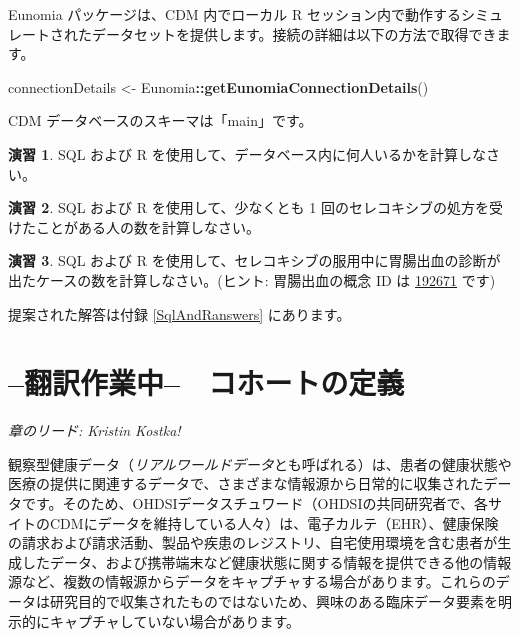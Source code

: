 \documentclass[
  11pt]{book}
\newenvironment{Shaded}{\begin{snugshade}}{\end{snugshade}}
\newcommand{\FunctionTok}[1]{\textcolor[rgb]{0.13,0.29,0.53}{\textbf{#1}}}
\newcommand{\NormalTok}[1]{#1}
\newcommand{\OtherTok}[1]{\textcolor[rgb]{0.56,0.35,0.01}{#1}}
\newcommand{\SpecialCharTok}[1]{\textcolor[rgb]{0.81,0.36,0.00}{\textbf{#1}}}
\theoremstyle{definition}
\theoremstyle{definition}
\theoremstyle{definition}
\newtheorem{exercise}{演習}[chapter]
\theoremstyle{definition}
\theoremstyle{remark}
\begin{document}
Eunomia パッケージは、CDM 内でローカル R セッション内で動作するシミュレートされたデータセットを提供します。接続の詳細は以下の方法で取得できます。

\begin{Shaded}
\begin{Highlighting}[]
\NormalTok{connectionDetails }\OtherTok{\textless{}{-}}\NormalTok{ Eunomia}\SpecialCharTok{::}\FunctionTok{getEunomiaConnectionDetails}\NormalTok{()}
\end{Highlighting}
\end{Shaded}

CDM データベースのスキーマは「main」です。

\begin{exercise}
\protect\hypertarget{exr:exercisePeopleCount}{}\label{exr:exercisePeopleCount}SQL および R を使用して、データベース内に何人いるかを計算しなさい。
\end{exercise}

\begin{exercise}
\protect\hypertarget{exr:exerciseCelecoxibUsers}{}\label{exr:exerciseCelecoxibUsers}SQL および R を使用して、少なくとも 1 回のセレコキシブの処方を受けたことがある人の数を計算しなさい。
\end{exercise}

\begin{exercise}
\protect\hypertarget{exr:exerciseGiBleedsDuringCelecoxib}{}\label{exr:exerciseGiBleedsDuringCelecoxib}SQL および R を使用して、セレコキシブの服用中に胃腸出血の診断が出たケースの数を計算しなさい。(ヒント: 胃腸出血の概念 ID は \href{http://athena.ohdsi.org/search-terms/terms/192671}{192671} です)
\end{exercise}

提案された解答は付録 \ref{SqlAndRanswers} にあります。

\chapter{--翻訳作業中--　コホートの定義}\label{Cohorts}

\emph{章のリード: Kristin Kostka!}

観察型健康データ（\emph{リアルワールドデータ}とも呼ばれる）は、患者の健康状態や医療の提供に関連するデータで、さまざまな情報源から日常的に収集されたデータです。そのため、OHDSIデータスチュワード（OHDSIの共同研究者で、各サイトのCDMにデータを維持している人々）は、電子カルテ（EHR）、健康保険の請求および請求活動、製品や疾患のレジストリ、自宅使用環境を含む患者が生成したデータ、および携帯端末など健康状態に関する情報を提供できる他の情報源など、複数の情報源からデータをキャプチャする場合があります。これらのデータは研究目的で収集されたものではないため、興味のある臨床データ要素を明示的にキャプチャしていない場合があります。
\end{document}
